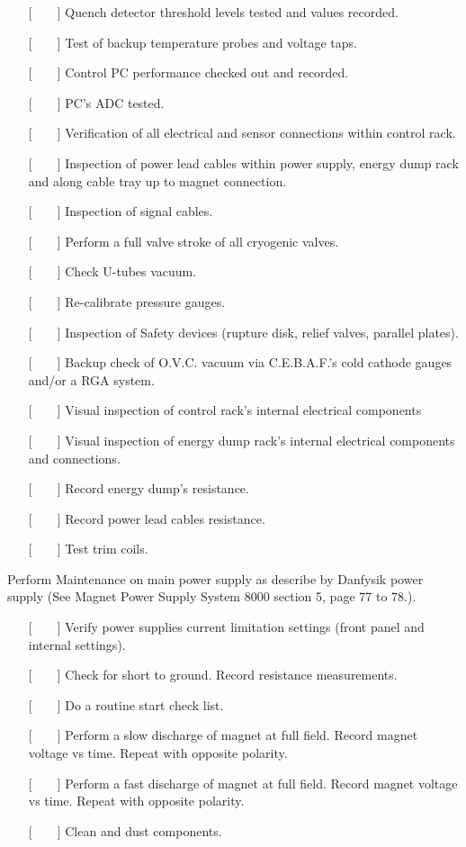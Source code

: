 {\begin{itemize}
\item[{[~~~~]}] {Quench detector threshold levels tested and values recorded.}
\item[{[~~~~]}] {Test of backup temperature probes and voltage taps.}
\item[{[~~~~]}] {Control PC performance checked out and recorded.}
\item[{[~~~~]}] {PC's ADC tested.}
\item[{[~~~~]}] {Verification of all electrical and sensor connections within control
 rack.}
\item[{[~~~~]}] {Inspection of power lead cables within power supply, energy dump
rack and along cable tray up to magnet connection.}
\item[{[~~~~]}] {Inspection of signal cables.}
\item[{[~~~~]}]  {Perform a full valve stroke of all cryogenic valves.}
\item[{[~~~~]}] {Check U-tubes vacuum.}
\item[{[~~~~]}] {Re-calibrate pressure gauges.}
\item[{[~~~~]}] {Inspection of Safety devices (rupture disk, relief valves, parallel
plates).}
\item[{[~~~~]}] {Backup check of O.V.C. vacuum via C.E.B.A.F.'s cold cathode gauges
and/or a RGA system.}
\item[{[~~~~]}] {Visual inspection of control rack's internal electrical components}
\item[{[~~~~]}] {Visual inspection of energy dump rack's internal electrical
components and connections.}
\item[{[~~~~]}] {Record energy dump's resistance.}
\item[{[~~~~]}] {Record power lead cables resistance.}
\item[{[~~~~]}] {Test trim coils.}
\end{itemize}
Perform Maintenance on main power supply as describe by Danfysik 
power supply (See Magnet Power Supply System 8000 section 5, page 77 to 78.).
\begin{itemize}
\item[{[~~~~]}] {Verify power supplies current limitation settings (front panel and
internal settings).}
\item[{[~~~~]}] {Check for short to ground. Record resistance measurements.}
\item[{[~~~~]}]  {Do a routine start check list.}
\item[{[~~~~]}] {Perform a slow discharge of magnet at full field. Record magnet
voltage vs time. Repeat with opposite polarity.}
\item[{[~~~~]}] {Perform a fast discharge of magnet at full field. Record magnet
voltage vs time. Repeat with opposite polarity.}
\item[{[~~~~]}]  {Clean and dust components.}
\end{itemize}

}
